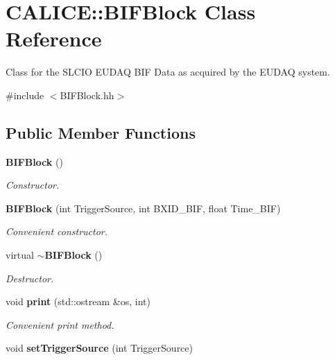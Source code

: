 \section{CALICE::BIFBlock Class Reference}
\label{classCALICE_1_1BIFBlock}


Class for the SLCIO EUDAQ BIF Data as acquired by the EUDAQ system.  


{\ttfamily \#include $<$BIFBlock.hh$>$}\subsection*{Public Member Functions}
\begin{DoxyCompactItemize}
\item 
{\bf BIFBlock} ()\label{classCALICE_1_1BIFBlock_a07e68d7015e5012ce8d2c6fcff0cb1ba}

\begin{DoxyCompactList}\small\item\em Constructor. \item\end{DoxyCompactList}\item 
{\bf BIFBlock} (int TriggerSource, int BXID\_\-BIF, float Time\_\-BIF)\label{classCALICE_1_1BIFBlock_ac7d82de3658f1c613a08072450a85fb0}

\begin{DoxyCompactList}\small\item\em Convenient constructor. \item\end{DoxyCompactList}\item 
virtual {\bf $\sim$BIFBlock} ()\label{classCALICE_1_1BIFBlock_a66d7f8a31626549b3c7b1b117cf70ae1}

\begin{DoxyCompactList}\small\item\em Destructor. \item\end{DoxyCompactList}\item 
void {\bf print} (std::ostream \&os, int)\label{classCALICE_1_1BIFBlock_a95fa0c06efa6a87da8cf1e8380072cde}

\begin{DoxyCompactList}\small\item\em Convenient print method. \item\end{DoxyCompactList}\item 
void {\bf setTriggerSource} (int TriggerSource)\label{classCALICE_1_1BIFBlock_a011c8771a288f584e02335821ecd2aa9}


\end{DoxyCompactItemize}
